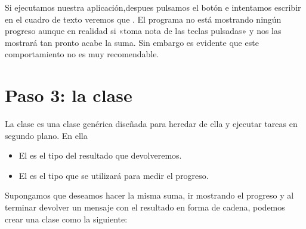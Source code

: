 \documentclass[letterpaper,10pt,spanish]{sphinxmanual}
\begin{document}
Si ejecutamos nuestra aplicación,despues pulsamos el botón  e intentamos escribir en el cuadro de texto veremos que  . El programa no está mostrando ningún progreso aunque en realidad si «toma nota de las teclas pulsadas» y nos las mostrará tan pronto acabe la suma. Sin embargo es evidente que este comportamiento no es muy recomendable.


\section{Paso 3: la clase }
\label{\detokenize{textos/anexo_hilos_con_swing:paso-3-la-clase-swingworker}}
La clase  es una clase genérica diseñada para heredar de ella y ejecutar tareas en segundo plano. En ella
\begin{itemize}
\item {} 
El  es el tipo del resultado que devolveremos.

\item {} 
El  es el tipo que se utilizará para medir el progreso.

\end{itemize}

Supongamos que deseamos hacer la misma suma, ir mostrando el progreso y al terminar devolver un mensaje con el resultado en forma de cadena, podemos crear una clase como la siguiente:
\end{document}
